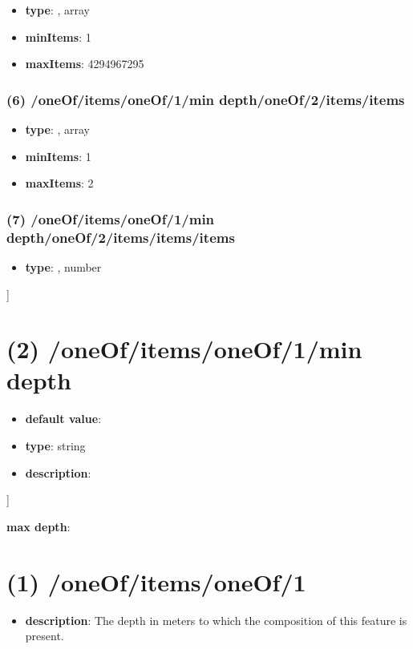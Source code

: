 \begin{itemize}[leftmargin=5em]\item {\bf type}: , array\item {\bf minItems}: 1
\item {\bf maxItems}: 4294967295
\end{itemize}\subsubsection{(6) /oneOf/items/oneOf/1/min depth/oneOf/2/items/items}
\begin{itemize}[leftmargin=6em]\item {\bf type}: , array\item {\bf minItems}: 1
\item {\bf maxItems}: 2
\end{itemize}\subsubsection{(7) /oneOf/items/oneOf/1/min depth/oneOf/2/items/items/items}
\begin{itemize}[leftmargin=7em]\item {\bf type}: , number\end{itemize}]\section{(2) /oneOf/items/oneOf/1/min depth}
\begin{itemize}[leftmargin=2em]\item {\bf default value}: 
\item {\bf type}: string
\item {\bf description}: 
\end{itemize}]\item {\bf max depth}: \section{(1) /oneOf/items/oneOf/1}
\begin{itemize}[leftmargin=1em]\item {\bf description}: The depth in meters to which the composition of this feature is present.
\end{itemize}
